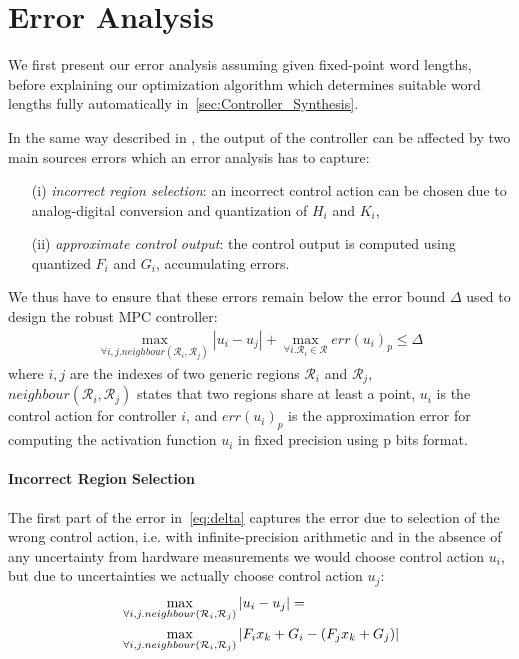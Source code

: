 \section{Error Analysis}
\label{sec:Error_Analysis}

We first present our error analysis assuming given fixed-point word lengths,
before explaining our optimization algorithm which determines suitable word
lengths fully automatically in~\autoref{sec:Controller_Synthesis}.

In the same way described in \cite{imperialrmpc}, the output of the controller can be affected by two main sources errors which an error
analysis has to capture: 
\begin{itemize}
  \item[(i)] \emph{incorrect region selection}: an incorrect control action can be chosen
    due to analog-digital conversion and quantization of $H_i$ and $K_i$,

  \item[(ii)] \emph{approximate control output}: the control output is computed
    using quantized $F_i$ and $G_i$, accumulating errors.
\end{itemize}

We thus have to ensure that these errors remain below the error bound $\Delta$
used to design the robust MPC controller:
\begin{align}\label{eq:delta}
  \max_{\forall i,j. neighbour(\mathcal{R}_{i},\mathcal{R}_{j})}|u_{i}-u_{j}| + \max_{\forall i.\mathcal{R}_{i}\in\mathcal{R}} err(u_{i})_{p} \le \Delta
\end{align}
where $i,j$ are the indexes of two generic regions $\mathcal{R}_{i}$ and
$\mathcal{R}_{j}$, \\ $neighbour(\mathcal{R}_{i},\mathcal{R}_{j})$ states that
two regions share at least a point, $u_{i}$ is the
control action for controller $i$, and $err(u_{i})_{p}$ is
the approximation error for computing the activation function $u_{i}$ in fixed precision using p bits format.
\paragraph{Incorrect Region Selection}

The first part of the error in~\autoref{eq:delta} captures the error due to
selection of the wrong control action, i.e. with infinite-precision arithmetic
and in the absence of any uncertainty from hardware measurements we would choose
control action $u_i$, but due to uncertainties we actually choose control action $u_j$:
\begin{align} \label{eq:maximization}
  &\max_{\forall i,j.neighbour(\mathcal{R}_{i},\mathcal{R}_{j})}|u_{i}-u_{j}|= \\
  &\max_{\forall i,j.neighbour(\mathcal{R}_{i},\mathcal{R}_{j})}|F_{i}x_{k}+G_{i} - (F_{j}x_{k}+G_{j})|\nonumber
\end{align}

